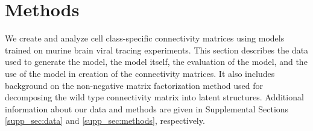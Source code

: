 \section{Methods}
\label{sec:methods}

We create and analyze cell class-specific connectivity matrices using models trained on murine brain viral tracing experiments.
This section describes the data used to generate the model, the model itself, the evaluation of the model, and the use of the model in creation of the connectivity matrices.
It also includes background on the non-negative matrix factorization method used for decomposing the wild type connectivity matrix into latent structures.
Additional information about our data and methods are given in Supplemental Sections \ref{supp_sec:data} and \ref{supp_sec:methods}, respectively.

